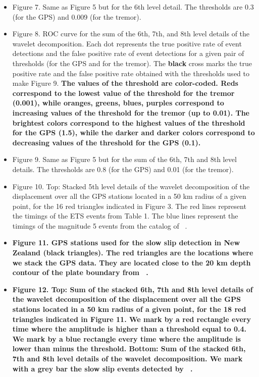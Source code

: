 \documentclass{article}
\begin{document}
\begin{itemize}
\item Figure 7. Same as Figure 5 but for the 6th level detail. The thresholds are 0.3 (for the GPS) and 0.009 (for the tremor).

\item Figure 8. ROC curve for the sum of the 6th, 7th, and 8th level details of the wavelet decomposition. Each dot represents the true positive rate of event detections and the false positive rate of event detections for a given pair of thresholds (for the GPS and for the tremor). The \textbf{black} cross marks the true positive rate and the false positive rate obtained with the thresholds used to make Figure 9. \textbf{The values of the threshold are color-coded. Reds correspond to the lowest value of the threshold for the tremor (0.001), while oranges, greens, blues, purples correspond to increasing values of the threshold for the tremor (up to 0.01). The brightest colors correspond to the highest values of the threshold for the GPS (1.5), while the darker and darker colors correspond to decreasing values of the threshold for the GPS (0.1).}

\item Figure 9. Same as Figure 5 but for the sum of the 6th, 7th and 8th level details. The thresholds are 0.8 (for the GPS) and 0.01 (for the tremor).

\item Figure 10. Top: Stacked 5th level details of the wavelet decomposition of the displacement over all the GPS stations located in a 50 km radius of a given point, for the 16 red triangles indicated in Figure 3. The red lines represent the timings of the ETS events from Table 1. The blue lines represent the timings of the magnitude 5 events from the catalog of ~\citet{MIC_2019}.

\item \textbf{Figure 11. GPS stations used for the slow slip detection in New Zealand (black triangles). The red triangles are the locations where we stack the GPS data. They are located close to the 20 km depth contour of the plate boundary from ~\citet{WIL_2013}.}

\item \textbf{Figure 12. Top: Sum of the stacked 6th, 7th and 8th level details of the wavelet decomposition of the displacement over all the GPS stations located in a 50 km radius of a given point, for the 18 red triangles indicated in Figure 11. We mark by a red rectangle every time where the amplitude is higher than a threshold equal to 0.4. We mark by a blue rectangle every time where the amplitude is lower than minus the threshold. Bottom: Sum of the stacked 6th, 7th and 8th level details of the wavelet decomposition. We mark with a grey bar the slow slip events detected by ~\citet{TOD_2016}.}

\end {itemize}
\end{document}
